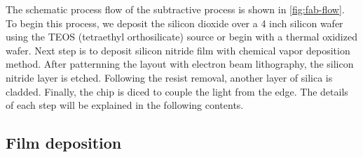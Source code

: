 The schematic process flow of the subtractive process is shown in \autoref{fig:fab-flow}. To begin this process, we deposit the silicon dioxide over a 4 inch silicon wafer using the TEOS  (tetraethyl orthosilicate) source or begin with a thermal oxidized wafer. Next step is to deposit silicon nitride film with chemical vapor deposition method. After patternning the layout with electron beam lithography, the silicon nitride layer is etched. Following the resist removal, another layer of silica is cladded. Finally, the chip is diced to couple the light from the edge. The details of each step will be explained in the following contents.


\subsection{Film deposition}

